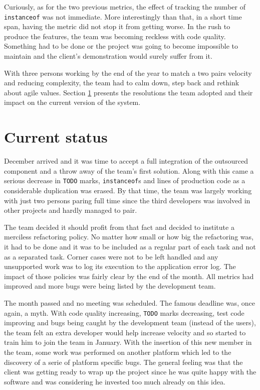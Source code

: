 \documentclass[lnbip]{svmultln}
\begin{document}
Curiously, as for the two previous metrics, the effect of tracking the
number of \texttt{instanceof} was not immediate. More interestingly
than that, in a short time span, having the metric did not stop it
from getting worse. In the rush to produce the features, the team was
becoming reckless with code quality.  Something had to be done or the
project was going to become impossible to maintain and the client's
demonstration would surely suffer from it.

With three persons working by the end of the year to match a two pairs
velocity and reducing complexity, the team had to calm down, step back
and rethink about agile values. Section \ref{sec:nowadays} presents
the resolutions the team adopted and their impact on the current
version of the system.

\section{Current status}
\label{sec:nowadays}

December arrived and it was time to accept a full integration of the
outsourced component and a throw away of the team's first
solution. Along with this came a serious decrease in \texttt{TODO}
marks, \texttt{instanceof}s and lines of production code as a
considerable duplication was erased. By that time, the team was
largely working with just two persons paring full time since the third
developers was involved in other projects and hardly managed to pair.

The team decided it should profit from that fact and decided to
institute a merciless refactoring policy. No matter how small or how
big the refactoring was, it had to be done and it was to be included
as a regular part of each task and not as a separated task. Corner
cases were not to be left handled and any unsupported work was to log
its execution to the application error log. The impact of those
policies was fairly clear by the end of the month. All metrics had
improved and more bugs were being listed by the development team.

The month passed and no meeting was scheduled. The famous deadline
was, once again, a myth. With code quality increasing, \texttt{TODO}
marks decreasing, test code improving and bugs being caught by the
development team (instead of the users), the team felt an extra
developer would help increase velocity and so started to train him to
join the team in January. With the insertion of this new member in the
team, some work was performed on another platform which led to the
discovery of a serie of platform specific bugs. The general feeling
was that the client was getting ready to wrap up the project since he
was quite happy with the software and was considering he invested too
much already on this idea.
\end{document}
